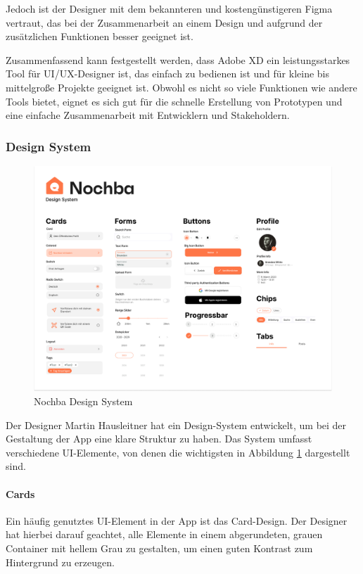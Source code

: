 Jedoch ist der Designer mit
dem bekannteren und kostengünstigeren Figma vertraut, das
bei der Zusammenarbeit an einem Design und aufgrund der
zusätzlichen Funktionen besser geeignet ist.

Zusammenfassend kann festgestellt werden, dass Adobe XD ein leistungsstarkes Tool für UI/UX-Designer ist, das einfach zu bedienen ist und für kleine bis mittelgroße Projekte geeignet ist. Obwohl es nicht so viele Funktionen wie andere Tools bietet, eignet es sich gut für die schnelle Erstellung von Prototypen und eine einfache Zusammenarbeit mit Entwicklern und Stakeholdern.

\subsubsection{Design System}
\begin{figure}[h]
  \centering
  \includegraphics[width=1\textwidth]{pics/design-system.png}
  \caption{Nochba Design System}
  \label{fig:design-system}
\end{figure}

Der Designer Martin Hausleitner hat ein Design-System
entwickelt, um bei der Gestaltung der App eine klare
Struktur zu haben. Das System umfasst verschiedene
UI-Elemente, von denen die wichtigsten in Abbildung
\ref{fig:design-system} dargestellt sind.

\paragraph{Cards}

Ein häufig genutztes UI-Element in der App ist das Card-Design. Der Designer hat hierbei darauf geachtet, alle Elemente in einem abgerundeten, grauen Container mit hellem Grau zu gestalten, um einen guten Kontrast zum Hintergrund zu erzeugen.

